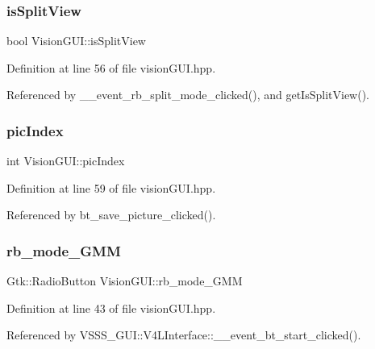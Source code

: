 \subsubsection{\texorpdfstring{is\+Split\+View}{isSplitView}}
{\footnotesize\ttfamily bool Vision\+G\+U\+I\+::is\+Split\+View\hspace{0.3cm}{\ttfamily [private]}}



Definition at line 56 of file vision\+G\+U\+I.\+hpp.



Referenced by \+\_\+\+\_\+event\+\_\+rb\+\_\+split\+\_\+mode\+\_\+clicked(), and get\+Is\+Split\+View().

\mbox{\label{class_vision_g_u_i_a45478a68d6dcd492aa57b2b4a1f14e32}} 
\subsubsection{\texorpdfstring{pic\+Index}{picIndex}}
{\footnotesize\ttfamily int Vision\+G\+U\+I\+::pic\+Index\hspace{0.3cm}{\ttfamily [private]}}



Definition at line 59 of file vision\+G\+U\+I.\+hpp.



Referenced by bt\+\_\+save\+\_\+picture\+\_\+clicked().

\mbox{\label{class_vision_g_u_i_aef9153130a527b6fae636466cd3ef77f}} 
\subsubsection{\texorpdfstring{rb\+\_\+mode\+\_\+\+G\+MM}{rb\_mode\_GMM}}
{\footnotesize\ttfamily Gtk\+::\+Radio\+Button Vision\+G\+U\+I\+::rb\+\_\+mode\+\_\+\+G\+MM}



Definition at line 43 of file vision\+G\+U\+I.\+hpp.



Referenced by V\+S\+S\+S\+\_\+\+G\+U\+I\+::\+V4\+L\+Interface\+::\+\_\+\+\_\+event\+\_\+bt\+\_\+start\+\_\+clicked().

